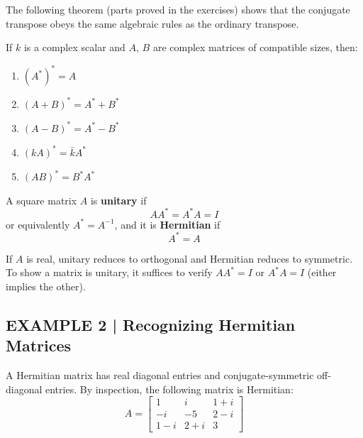 \documentclass{article}
\begin{document}
The following theorem (parts proved in the exercises) shows that the conjugate transpose obeys the same algebraic rules as the ordinary transpose.

\begin{tcolorbox}[colback=red!4, colframe=red!60!black,
  title={\textbf{Theorem 7.5.1}}, boxrule=0.5mm, arc=3mm]
If $k$ is a complex scalar and $A$, $B$ are complex matrices of compatible sizes, then:
\begin{enumerate}
  \item[(a)] $(A^*)^* = A$
  \item[(b)] $(A+B)^* = A^*+B^*$
  \item[(c)] $(A-B)^* = A^*-B^*$
  \item[(d)] $(kA)^* = \bar{k}A^*$
  \item[(e)] $(AB)^* = B^*A^*$
\end{enumerate}
\end{tcolorbox}

\begin{tcolorbox}[colback=teal!4, colframe=teal!65!black,
  title={\textbf{Definition 2}}, boxrule=0.5mm, arc=3mm]
A square matrix $A$ is \textbf{unitary} if
\begin{equation}
  AA^* = A^*A = I
\end{equation}
or equivalently $A^* = A^{-1}$, and it is \textbf{Hermitian}\footnotemark{} if
\begin{equation}
  A^* = A
\end{equation}
\end{tcolorbox}

If $A$ is real, unitary reduces to orthogonal and Hermitian reduces to symmetric.
To show a matrix is unitary, it suffices to verify $AA^* = I$ or $A^*A = I$ (either implies the other).

\subsection*{EXAMPLE 2 | Recognizing Hermitian Matrices}

A Hermitian matrix has real diagonal entries and conjugate-symmetric off-diagonal entries.
By inspection, the following matrix is Hermitian:
\[
  A = \begin{bmatrix} 1 & i & 1+i \\ -i & -5 & 2-i \\ 1-i & 2+i & 3 \end{bmatrix}
\]
\end{document}
